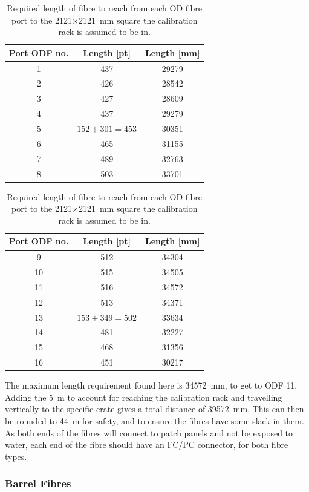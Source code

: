 \documentclass[a4paper,11pt]{article}
\begin{document}
\begin{center}
\begin{table}[h]
\begin{tabular}{ccc} \toprule
Port ODF no. &	Length [pt]	&	Length [mm] \\ \midrule
	1			&	437			&	29279		\\
	2			&	426			&	28542		\\
	3			&	427			&	28609		\\
	4			&	437			&	29279		\\
	5			&$152+301=453$	&	30351		\\
	6			&	465			&	31155		\\
	7			&	489			&	32763		\\
	8			&	503			&	33701		\\
	\bottomrule
\end{tabular}
\begin{tabular}{ccc} \toprule
Port ODF no. &	Length [pt]	&	Length [mm] \\ \midrule
	9			&	512			&	34304		\\
	10			&	515			&	34505		\\
	11			&	516			&	34572		\\
	12			&	513			&	34371		\\
	13			&$153+349=502$	&	33634		\\
	14			&	481			&	32227		\\
	15			&	468			&	31356		\\
	16			&	451			&	30217		\\
	\bottomrule
\end{tabular}
\caption{Required length of fibre to reach from each OD fibre port to the 2121$\times$2121~mm square the calibration rack is assumed to be in.}\label{tab:deckFibreLen}
\end{table}
\end{center}
The maximum length requirement found here is 34572~mm, to get to ODF 11. Adding the 5~m to account for reaching the calibration rack and travelling vertically to the specific crate gives a total distance of 39572~mm. This can then be rounded to 44~m for safety, and to ensure the fibres have some slack in them. As both ends of the fibres will connect to patch panels and not be exposed to water, each end of the fibre should have an FC/PC connector, for both fibre types.

\subsubsection{Barrel Fibres}\label{sec:lengths:sub:len:sub:barrel}
\end{document}
